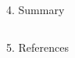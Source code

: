 \documentclass[final]{beamer}
\begin{document}
\begin{frame}{}
\begin{block}{4. Summary}
\begin{columns}
\begin{column}{0.48\textwidth}
            \end{column}
        \end{columns}
    \end{block}
    
    \begin{block}{5. References}
    \tiny{
        
    }
    \end{block}
  
  
  
\end{frame}
\end{document}
